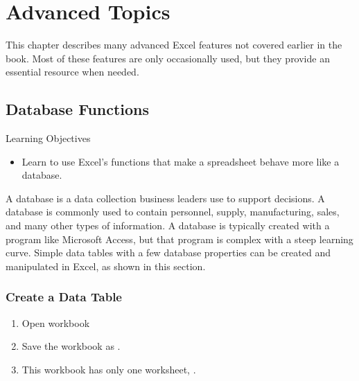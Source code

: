 \chapter{Advanced Topics}\label{ch09:topics}

This chapter describes many advanced Excel features not covered earlier in the book. Most of these features are only occasionally used, but they provide an essential resource when needed.

\section{Database Functions}

\begin{center}
	\begin{objbox}{Learning Objectives}
		\begin{itemize}
			\setlength{\itemsep}{0pt}
			\setlength{\parskip}{0pt}
			\setlength{\parsep}{0pt}
			
			\item Learn to use Excel's functions that make a spreadsheet behave more like a database.
		\end{itemize}
	\end{objbox}
\end{center}

A database is a data collection business leaders use to support decisions. A database is commonly used to contain personnel, supply, manufacturing, sales, and many other types of information. A database is typically created with a program like Microsoft Access, but that program is complex with a steep learning curve. Simple data tables with a few database properties can be created and manipulated in Excel, as shown in this section.

\subsection{Create a Data Table}

\begin{enumbox}
	\begin{enumerate}
		\item Open workbook 
		\item Save the workbook as .
		\item This workbook has only one worksheet, .
	\end{enumerate}
\end{enumbox}
	

